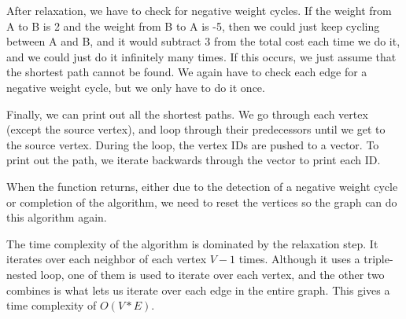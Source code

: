 \documentclass[letterpaper, 10pt,DIV=13]{scrartcl}
\numberwithin{equation}{section} %
\numberwithin{figure}{section} %
\numberwithin{table}{section} %
\begin{document}
After relaxation, we have to check for negative weight cycles. If the weight from A to B is 2 and the weight from B to A is -5, then we could just keep cycling between A and B, and it would subtract 3 from the total cost each time we do it, and we could just do it infinitely many times. If this occurs, we just assume that the shortest path cannot be found. We again have to check each edge for a negative weight cycle, but we only have to do it once.

Finally, we can print out all the shortest paths. We go through each vertex (except the source vertex), and loop through their predecessors until we get to the source vertex. During the loop, the vertex IDs are pushed to a vector. To print out the path, we iterate backwards through the vector to print each ID.

When the function returns, either due to the detection of a negative weight cycle or completion of the algorithm, we need to reset the vertices so the graph can do this algorithm again.

The time complexity of the algorithm is dominated by the relaxation step. It iterates over each neighbor of each vertex $V-1$ times. Although it uses a triple-nested loop, one of them is used to iterate over each vertex, and the other two combines is what lets us iterate over each edge in the entire graph. This gives a time complexity of $O(V*E)$.
\end{document}

